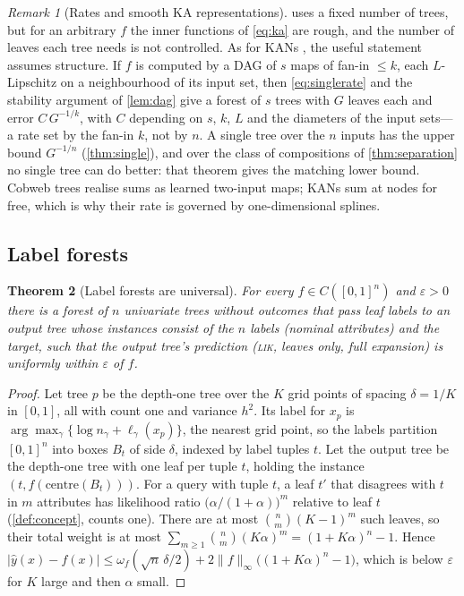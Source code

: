 \documentclass[11pt]{article}
\newtheorem{theorem}{Theorem}
\theoremstyle{definition}
\theoremstyle{remark}
\newtheorem{remark}[theorem]{Remark}
\newcommand{\hy}{\hat{y}}
\begin{document}
\begin{remark}[Rates and smooth KA representations]\label{rem:rates}
 uses a fixed number of trees, but for an arbitrary $f$ the inner functions
of \eqref{eq:ka} are rough, and the number of leaves each tree needs is not controlled.
As for KANs \citep[Thm.~2.1]{liu2024kan}, the useful statement assumes structure.  If
$f$ is computed by a DAG of $s$ maps of fan-in $\le k$, each $L$-Lipschitz on a
neighbourhood of its input set, then \eqref{eq:singlerate} and the stability argument of
\cref{lem:dag} give a forest of $s$ trees with $G$ leaves each and error $C\,G^{-1/k}$, with $C$
depending on $s$, $k$, $L$ and the diameters of the input sets---a rate set by the fan-in
$k$, not by $n$.  A single
tree over the $n$ inputs has the upper bound $G^{-1/n}$ (\cref{thm:single}), and over the
class of compositions of \cref{thm:separation} no single tree can do better: that theorem
gives the matching lower bound.  Cobweb trees realise
sums as learned two-input maps; KANs sum at nodes for free, which is why their rate is
governed by one-dimensional splines.
\end{remark}

\subsection{Label forests}

\begin{theorem}[Label forests are universal]\label{thm:label}
For every $f\in C([0,1]^n)$ and $\varepsilon>0$ there is a forest of $n$ univariate trees
without outcomes that pass leaf labels to an output tree whose instances consist of the
$n$ labels (nominal attributes) and the target, such that the output tree's prediction
(\textsc{lik}, leaves only, full expansion) is uniformly within $\varepsilon$ of $f$.
\end{theorem}
\begin{proof}
Let tree $p$ be the depth-one tree over the $K$ grid points of spacing $\delta=1/K$ in
$[0,1]$, all with count one and variance $h^2$.  Its label for $x_p$ is
$\arg\max_\gamma\{\log n_\gamma+\ell_\gamma(x_p)\}$, the nearest grid point, so the
labels partition $[0,1]^n$ into boxes $B_t$ of side $\delta$, indexed by label tuples
$t$.  Let the output tree be the depth-one tree with one leaf per tuple $t$, holding the
instance $(t,f(\text{centre}(B_t)))$.  For a query with tuple $t$, a leaf $t'$ that
disagrees with $t$ in $m$ attributes has likelihood ratio $\bigl(\alpha/(1+\alpha)\bigr)^m$
relative to leaf $t$ (\cref{def:concept}, counts one).  There are at most
$\binom nm(K-1)^m$ such leaves, so their total weight is at most
$\sum_{m\ge1}\binom nm(K\alpha)^m=(1+K\alpha)^n-1$.  Hence
$|\hy(x)-f(x)|\le\omega_f(\sqrt n\,\delta/2)+2\|f\|_\infty\bigl((1+K\alpha)^n-1\bigr)$,
which is below $\varepsilon$ for $K$ large and then $\alpha$ small.
\end{proof}
\end{document}
